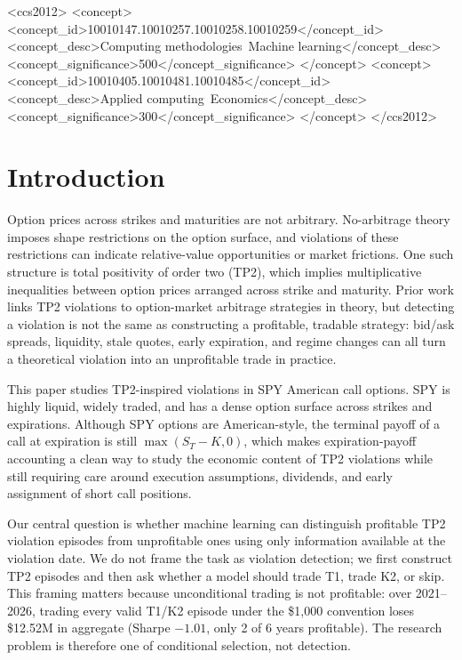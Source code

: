 \documentclass[sigconf,review]{acmart}
\begin{document}
\begin{CCSXML}
<ccs2012>
 <concept>
  <concept_id>10010147.10010257.10010258.10010259</concept_id>
  <concept_desc>Computing methodologies~Machine learning</concept_desc>
  <concept_significance>500</concept_significance>
 </concept>
 <concept>
  <concept_id>10010405.10010481.10010485</concept_id>
  <concept_desc>Applied computing~Economics</concept_desc>
  <concept_significance>300</concept_significance>
 </concept>
</ccs2012>
\end{CCSXML}



\maketitle

\section{Introduction}
\label{sec:intro}

Option prices across strikes and maturities are not arbitrary. No-arbitrage theory imposes shape restrictions on the option surface, and violations of these restrictions can indicate relative-value opportunities or market frictions. One such structure is total positivity of order two (TP2), which implies multiplicative inequalities between option prices arranged across strike and maturity. Prior work links TP2 violations to option-market arbitrage strategies in theory, but detecting a violation is not the same as constructing a profitable, tradable strategy: bid/ask spreads, liquidity, stale quotes, early expiration, and regime changes can all turn a theoretical violation into an unprofitable trade in practice.

This paper studies TP2-inspired violations in SPY American call options. SPY is highly liquid, widely traded, and has a dense option surface across strikes and expirations. Although SPY options are American-style, the terminal payoff of a call at expiration is still $\max(S_T-K,0)$, which makes expiration-payoff accounting a clean way to study the economic content of TP2 violations while still requiring care around execution assumptions, dividends, and early assignment of short call positions.

Our central question is whether machine learning can distinguish profitable TP2 violation episodes from unprofitable ones using only information available at the violation date. We do not frame the task as violation detection; we first construct TP2 episodes and then ask whether a model should trade T1, trade K2, or skip. This framing matters because unconditional trading is not profitable: over 2021--2026, trading every valid T1/K2 episode under the \$1,000 convention loses \$12.52M in aggregate (Sharpe $-1.01$, only 2 of 6 years profitable). The research problem is therefore one of conditional selection, not detection.
\end{document}
